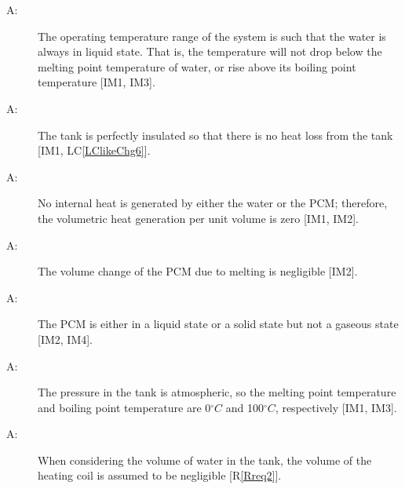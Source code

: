 \documentclass[12pt]{article}
\newcounter{assumpnum}
\newcommand{\atheassumpnum}{A\theassumpnum}
\begin{document}
\begin{description}
\item[\atheassumpnum\label{Aassump14}:]The operating temperature range of the system is such that the water is always in liquid state. That is, the temperature will not drop below the melting point temperature of water, or rise above its boiling point temperature [IM1, IM3].
\end{description}
\begin{description}
\item[\atheassumpnum\label{Aassump15}:]The tank is perfectly insulated so that there is no heat loss from the tank [IM1, LC\ref{LClikeChg6}].
\end{description}
\begin{description}
\item[\atheassumpnum\label{Aassump16}:]No internal heat is generated by either the water or the PCM; therefore, the volumetric heat generation per unit volume is zero [IM1, IM2].
\end{description}
\begin{description}
\item[\atheassumpnum\label{Aassump17}:]The volume change of the PCM due to melting is negligible [IM2].
\end{description}
\begin{description}
\item[\atheassumpnum\label{Aassump18}:]The PCM is either in a liquid state or a solid state but not a gaseous state [IM2, IM4].
\end{description}
\begin{description}
\item[\atheassumpnum\label{Aassump19}:]The pressure in the tank is atmospheric, so the melting point temperature and boiling point temperature are 0${}^{\circ}C$ and 100${}^{\circ}C$, respectively [IM1, IM3].
\end{description}
\begin{description}
\item[\atheassumpnum\label{Aassump20}:]When considering the volume of water in the tank, the volume of the heating coil is assumed to be negligible [R\ref{Rreq2}].
\end{description}
\end{document}
